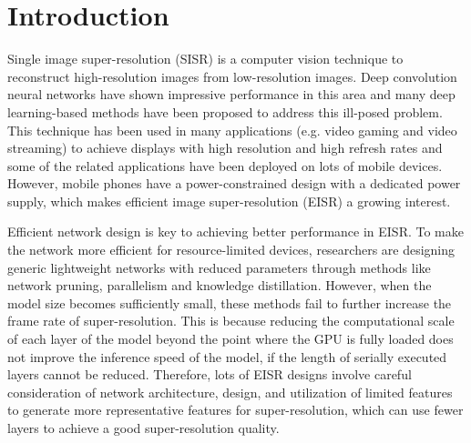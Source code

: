 \documentclass[10pt,twocolumn,letterpaper]{article}
\begin{document}
\section{Introduction}
\label{sec:intro}

Single image super-resolution (SISR) is a computer vision technique to reconstruct high-resolution images from low-resolution images. Deep convolution neural networks have shown impressive performance in this area and many deep learning-based methods have been proposed to address this ill-posed problem.
This technique has been used in many applications (e.g. video gaming\cite{10.1145/2751496.2751502} and video streaming\cite{kimNeuralEnhancedLiveStreaming2020,yeoNeuralAdaptiveContentaware2018,maoNeuralAdaptiveVideo2017}) to achieve displays with high resolution and high refresh rates and some of the related applications have been deployed on lots of mobile devices\cite{yeoNEMOEnablingNeuralenhanced2020,mehtaEVRNetEfficientVideo2021}.
However, mobile phones have a power-constrained design with a dedicated power supply, which makes efficient image super-resolution (EISR) a growing interest.

Efficient network design is key to achieving better performance in EISR.
To make the network more efficient for resource-limited devices, researchers are designing generic lightweight networks with reduced parameters through methods like network pruning\cite{liuSplitSREndtoEndApproach2021,leeMobiSREfficientOnDevice2019,fang2023depgraph}, parallelism\cite{sandlerMobileNetV2InvertedResiduals2019,howardMobileNetsEfficientConvolutional2017,liuSplitSREndtoEndApproach2021,kongClassSRGeneralFramework2021} and knowledge distillation\cite{liu2020residual,khaniRealTimeVideoInference2021,taoCompressionGenerativePretrained2022,zhangDataFreeKnowledgeDistillation2021}.
However, when the model size becomes sufficiently small, these methods fail to further increase the frame rate of super-resolution. This is because reducing the computational scale of each layer of the model beyond the point where the GPU is fully loaded does not improve the inference speed of the model, if the length of serially executed layers cannot be reduced.
Therefore, lots of EISR designs\cite{liNTIRE2022Challenge2022,duFastMemoryEfficientNetwork2022,mehtaEVRNetEfficientVideo2021} involve careful consideration of network architecture, design, and utilization of limited features to generate more representative features for super-resolution, which can use fewer layers to achieve a good super-resolution quality.
\end{document}

